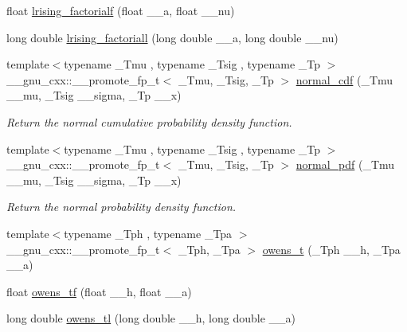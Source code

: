 \begin{DoxyCompactItemize}
float \hyperlink{group__gnu__math__spec__func_ga68c64f4e44d03b5b3f75f90dbe2e0819}{lrising\+\_\+factorialf} (float \+\_\+\+\_\+a, float \+\_\+\+\_\+nu)
\item 
long double \hyperlink{group__gnu__math__spec__func_ga1ac811f56f38f7ea7a1e035ec0157f6b}{lrising\+\_\+factoriall} (long double \+\_\+\+\_\+a, long double \+\_\+\+\_\+nu)
\item 
{\footnotesize template$<$typename \+\_\+\+Tmu , typename \+\_\+\+Tsig , typename \+\_\+\+Tp $>$ }\\\+\_\+\+\_\+gnu\+\_\+cxx\+::\+\_\+\+\_\+promote\+\_\+fp\+\_\+t$<$ \+\_\+\+Tmu, \+\_\+\+Tsig, \+\_\+\+Tp $>$ \hyperlink{group__gnu__math__spec__func_gacba6cec6dfb42d64614b7ef1d198cd13}{normal\+\_\+cdf} (\+\_\+\+Tmu \+\_\+\+\_\+mu, \+\_\+\+Tsig \+\_\+\+\_\+sigma, \+\_\+\+Tp \+\_\+\+\_\+x)
\begin{DoxyCompactList}\small\item\em Return the normal cumulative probability density function. \end{DoxyCompactList}\item 
{\footnotesize template$<$typename \+\_\+\+Tmu , typename \+\_\+\+Tsig , typename \+\_\+\+Tp $>$ }\\\+\_\+\+\_\+gnu\+\_\+cxx\+::\+\_\+\+\_\+promote\+\_\+fp\+\_\+t$<$ \+\_\+\+Tmu, \+\_\+\+Tsig, \+\_\+\+Tp $>$ \hyperlink{group__gnu__math__spec__func_gaff2213ae9a4822cbd506f05300f061f4}{normal\+\_\+pdf} (\+\_\+\+Tmu \+\_\+\+\_\+mu, \+\_\+\+Tsig \+\_\+\+\_\+sigma, \+\_\+\+Tp \+\_\+\+\_\+x)
\begin{DoxyCompactList}\small\item\em Return the normal probability density function. \end{DoxyCompactList}\item 
{\footnotesize template$<$typename \+\_\+\+Tph , typename \+\_\+\+Tpa $>$ }\\\+\_\+\+\_\+gnu\+\_\+cxx\+::\+\_\+\+\_\+promote\+\_\+fp\+\_\+t$<$ \+\_\+\+Tph, \+\_\+\+Tpa $>$ \hyperlink{group__gnu__math__spec__func_gaa6ca4f2127c6c2101dc360673304cc2c}{owens\+\_\+t} (\+\_\+\+Tph \+\_\+\+\_\+h, \+\_\+\+Tpa \+\_\+\+\_\+a)
\item 
float \hyperlink{group__gnu__math__spec__func_gac24d32e9b072c4953654d5559f992871}{owens\+\_\+tf} (float \+\_\+\+\_\+h, float \+\_\+\+\_\+a)
\item 
long double \hyperlink{group__gnu__math__spec__func_ga7a8bc60dc0ef4a009586872eb7cac2d0}{owens\+\_\+tl} (long double \+\_\+\+\_\+h, long double \+\_\+\+\_\+a)
\item 

\end{DoxyCompactItemize}
